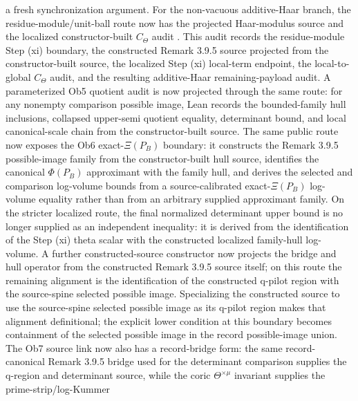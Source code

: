 \begin{proposition}
  a fresh synchronization argument.
  For the non-vacuous additive-Haar branch, the residue-module/unit-ball route
  now has the projected Haar-modulus source
  and the localized constructor-built \(C_\Theta\) audit
  .
  This audit records the residue-module Step (xi) boundary, the constructed
  Remark 3.9.5 source projected from the constructor-built source, the
  localized Step (xi) local-term endpoint, the local-to-global \(C_\Theta\)
  audit, and the resulting additive-Haar remaining-payload audit.
  A parameterized Ob5 quotient audit is now projected through the same route:
  for any nonempty comparison possible image, Lean records the bounded-family
  hull inclusions, collapsed upper-semi quotient equality, determinant bound,
  and local canonical-scale chain from the constructor-built source.  The same
  public route now exposes the Ob6 exact-\(\Xi(P_B)\) boundary: it constructs
  the Remark 3.9.5 possible-image family from the constructor-built hull source,
  identifies the canonical \(\Phi(P_B)\) approximant with the family hull, and
  derives the selected and comparison log-volume bounds from a source-calibrated
  exact-\(\Xi(P_B)\) log-volume equality rather than from an arbitrary supplied
  approximant family.
  On
  the stricter localized
  route, the final
  normalized determinant
  upper bound is no longer supplied as an independent inequality: it is derived
  from the identification of the Step (xi) theta scalar with the constructed
  localized family-hull log-volume.  A further
  constructed-source constructor now projects the bridge and hull operator from
  the constructed Remark 3.9.5 source itself; on this route the remaining
  alignment is the identification of the constructed q-pilot region with the
  source-spine selected possible image.  Specializing the constructed source to
  use the source-spine selected possible image as its q-pilot region makes that
  alignment definitional; the explicit lower condition at this boundary becomes
  containment of the selected possible image in the record possible-image
  union.  The Ob7 source link now also has a record-bridge form: the same
  record-canonical Remark 3.9.5 bridge used for the determinant comparison
  supplies the q-region and determinant source, while the coric
  \(\Theta^{\times\mu}\) invariant supplies the prime-strip/log-Kummer

\end{proposition}
